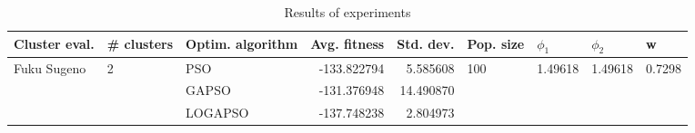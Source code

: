 \begin{table}
\centering
\caption{Results of experiments}
\begin{tabular}{lllrrllll}
\toprule
               Cluster eval. &        \# clusters & Optim. algorithm &  Avg. fitness &  Std. dev. &            Pop. size &               $\phi_{1}$ &               $\phi_{2}$ &                       w \\
\midrule
\multirow{3}{*}{Fuku Sugeno} & \multirow{3}{*}{2} &              PSO &   -133.822794 &   5.585608 & \multirow{3}{*}{100} & \multirow{3}{*}{1.49618} & \multirow{3}{*}{1.49618} & \multirow{3}{*}{0.7298} \\
                             &                    &            GAPSO &   -131.376948 &  14.490870 &                      &                          &                          &                         \\
                             &                    &          LOGAPSO &   -137.748238 &   2.804973 &                      &                          &                          &                         \\
\bottomrule
\end{tabular}
\end{table}
